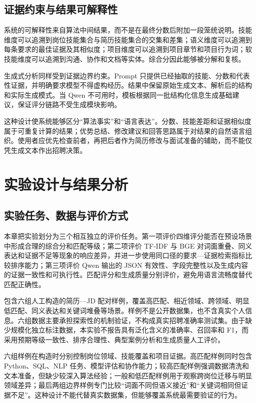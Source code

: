 \documentclass[UTF8,zihao=-4,a4paper,oneside]{ctexrep}
\begin{document}
\section{证据约束与结果可解释性}


系统的可解释性来自算法中间结果，而不是在最终分数后附加一段笼统说明。技能维度可以追溯到岗位技能集合与简历技能集合的交集和差集；语义维度可以追溯到每条要求的最佳证据及其相似度；项目维度可以追溯到项目章节和项目行为词；软技能维度可以追溯到沟通、协作和文档等实体。综合分因此能够被分解和复核。


生成式分析同样受到证据边界约束。Prompt 只提供已经抽取的技能、分数和代表性证据，并明确要求模型不得虚构经历。结果中保留原始生成文本、解析后的结构和实际生成模式。当 Qwen 不可用时，模板根据同一批结构化信息生成基础建议，保证评分链路不受生成模块影响。


这种设计使系统能够区分“算法事实”和“语言表达”。分数、技能差距和证据相似度属于可重复计算的结果；优势总结、修改建议和回答思路属于对结果的自然语言组织。使用者应优先检查前者，再把后者作为简历修改与面试准备的辅助，而不能仅凭生成文本作出招聘决策。


\chapter{实验设计与结果分析}


\section{实验任务、数据与评价方式}


本章把实验划分为三个相互独立的评价任务。第一项评价四维评分能否在预设场景中形成合理的综合分和匹配等级；第二项评价 TF-IDF 与 BGE 对词面重叠、同义表达和证据不足等现象的响应差异，并进一步使用同口径的要求—证据检索指标比较排序能力；第三项评价 Qwen 输出的 JSON 有效性、字段完整性以及生成内容的证据一致性和可执行性。匹配评分和生成质量分别评价，避免用语言流畅度替代匹配正确性。


\texttt{} 包含六组人工构造的简历—JD 配对样例，覆盖高匹配、相近领域、跨领域、明显低匹配、同义表达和关键词堆叠等场景。样例不是公开数据集，也不含真实个人信息。六组数据主要承担探索性的机制验证，不构成真实招聘准确率测试集。由于缺少规模化独立标注数据，本实验不报告具有泛化含义的准确率、召回率和 F1，而采用预期等级一致性、排序合理性、典型案例分析和生成质量人工评价。


六组样例在构造时分别控制岗位领域、技能覆盖和项目证据。高匹配样例同时包含 Python、SQL、NLP 任务、模型评估和协作能力；较高匹配样例强调数据清洗和文本准备，但缺少较深入算法经验；一般和低匹配样例用于观察跨岗位迁移与明显领域差异；最后两组边界样例专门比较“词面不同但语义接近”和“关键词相同但证据不足”。这种设计不能代替真实数据集，但能够覆盖系统最需要验证的行为。
\end{document}
